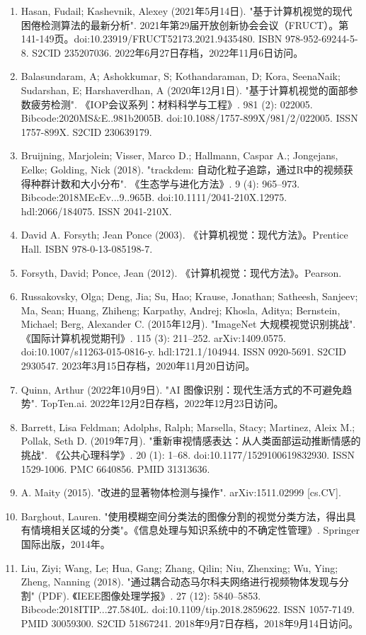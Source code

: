 \begin{enumerate}
\item Hasan, Fudail; Kashevnik, Alexey (2021年5月14日). "基于计算机视觉的现代困倦检测算法的最新分析". 2021年第29届开放创新协会会议（FRUCT）。第141-149页。doi:10.23919/FRUCT52173.2021.9435480. ISBN 978-952-69244-5-8. S2CID 235207036. 2022年6月27日存档，2022年11月6日访问。
\item Balasundaram, A; Ashokkumar, S; Kothandaraman, D; Kora, SeenaNaik; Sudarshan, E; Harshaverdhan, A (2020年12月1日). "基于计算机视觉的面部参数疲劳检测". 《IOP会议系列：材料科学与工程》. 981 (2): 022005. Bibcode:2020MS&E..981b2005B. doi:10.1088/1757-899X/981/2/022005. ISSN 1757-899X. S2CID 230639179.
\item Bruijning, Marjolein; Visser, Marco D.; Hallmann, Caspar A.; Jongejans, Eelke; Golding, Nick (2018). "trackdem: 自动化粒子追踪，通过R中的视频获得种群计数和大小分布". 《生态学与进化方法》. 9 (4): 965–973. Bibcode:2018MEcEv...9..965B. doi:10.1111/2041-210X.12975. hdl:2066/184075. ISSN 2041-210X.
\item David A. Forsyth; Jean Ponce (2003). 《计算机视觉：现代方法》。Prentice Hall. ISBN 978-0-13-085198-7.
\item Forsyth, David; Ponce, Jean (2012). 《计算机视觉：现代方法》。Pearson.
\item Russakovsky, Olga; Deng, Jia; Su, Hao; Krause, Jonathan; Satheesh, Sanjeev; Ma, Sean; Huang, Zhiheng; Karpathy, Andrej; Khosla, Aditya; Bernstein, Michael; Berg, Alexander C. (2015年12月). "ImageNet 大规模视觉识别挑战". 《国际计算机视觉期刊》. 115 (3): 211–252. arXiv:1409.0575. doi:10.1007/s11263-015-0816-y. hdl:1721.1/104944. ISSN 0920-5691. S2CID 2930547. 2023年3月15日存档，2020年11月20日访问。
\item Quinn, Arthur (2022年10月9日). "AI 图像识别：现代生活方式的不可避免趋势". TopTen.ai. 2022年12月2日存档，2022年12月23日访问。
\item Barrett, Lisa Feldman; Adolphs, Ralph; Marsella, Stacy; Martinez, Aleix M.; Pollak, Seth D. (2019年7月). "重新审视情感表达：从人类面部运动推断情感的挑战". 《公共心理科学》. 20 (1): 1–68. doi:10.1177/1529100619832930. ISSN 1529-1006. PMC 6640856. PMID 31313636.
\item A. Maity (2015). "改进的显著物体检测与操作". arXiv:1511.02999 [cs.CV].
\item Barghout, Lauren. "使用模糊空间分类法的图像分割的视觉分类方法，得出具有情境相关区域的分类"。《信息处理与知识系统中的不确定性管理》. Springer国际出版，2014年。
\item Liu, Ziyi; Wang, Le; Hua, Gang; Zhang, Qilin; Niu, Zhenxing; Wu, Ying; Zheng, Nanning (2018). "通过耦合动态马尔科夫网络进行视频物体发现与分割" (PDF). 《IEEE图像处理学报》. 27 (12): 5840–5853. Bibcode:2018ITIP...27.5840L. doi:10.1109/tip.2018.2859622. ISSN 1057-7149. PMID 30059300. S2CID 51867241. 2018年9月7日存档，2018年9月14日访问。

\end{enumerate}
